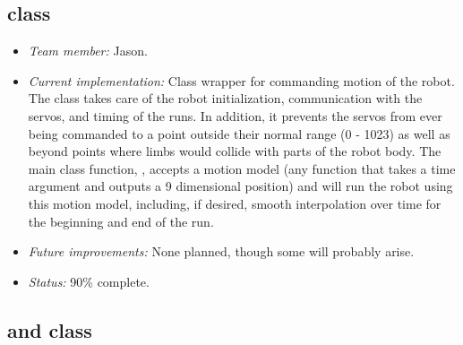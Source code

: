 \subsection*{ class}

\begin{itemize}
\item \emph{Team member:} Jason.
\item \emph{Current implementation:} Class wrapper for commanding
  motion of the robot.  The  class takes care of the robot
  initialization, communication with the servos, and timing of the
  runs.  In addition, it prevents the servos from ever being commanded
  to a point outside their normal range (0 - 1023) as well as beyond
  points where limbs would collide with parts of the robot body.  The
  main class function, , accepts a motion model (any
  function that takes a time argument and outputs a 9 dimensional
  position) and will run the robot using this motion model, including,
  if desired, smooth interpolation over time for the beginning and end
  of the run.
\item \emph{Future improvements:} None planned, though some will
  probably arise.
\item \emph{Status:} 90\% complete.
\end{itemize}



\subsection*{ and  class}

